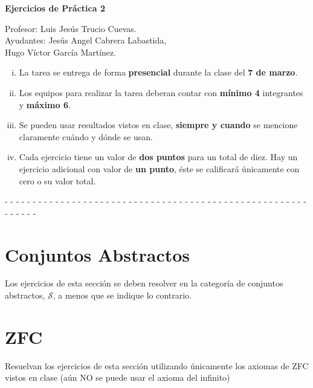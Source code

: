 \documentclass[12pt]{article}
\newcommand{\topos}[1]{\mathscr{#1}}
\begin{document}
    \begin{center}
      \Huge \textbf{Ejercicios de Práctica 2} \\
    \end{center}
    \begin{flushright}
      \footnotesize Profesor: Luis Jesús Trucio Cuevas.\\
      Ayudantes: Jesús Angel Cabrera Labastida,\\
      Hugo Víctor García Martínez.
    \end{flushright}
    \footnotesize
    \begin{enumerate}[i)]
      \item La tarea se entrega de forma \textbf{presencial} durante la clase del \textbf{7 de marzo}.
      \item Los equipos para realizar la tarea deberan contar con \textbf{mínimo 4} integrantes y \textbf{máximo 6}.
      \item Se pueden usar resultados vistos en clase, \textbf{siempre y cuando} se mencione claramente cuándo y dónde se usan.
      \item Cada ejercicio tiene un valor de \textbf{dos puntos} para un total de diez. Hay un ejercicio adicional con valor de \textbf{un punto}, éste se calificará únicamente con cero o su valor total.
  \end{enumerate}\normalsize
    \begin{center}
      - - - - - - - - - - - - - - - - - - - - - - - - - - - - - - - - - - - - - - - - - - - - - - - - - - - - - - - - - - - - 
    \end{center}
    \section*{Conjuntos Abstractos}
    Los ejercicios de esta sección se deben resolver en la categoría de
    conjuntos abstractos, \(\topos{S}\), a menos que se indique lo contrario.
    
    
    \section*{ZFC}
    Resuelvan los ejercicios de esta sección utilizando únicamente los axiomas de ZFC vistos en clase (aún NO se puede usar el axioma del infinito)
    

\end{document}
